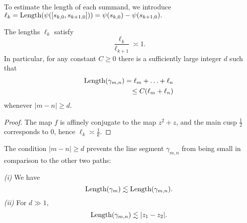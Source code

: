 

To estimate the length of each summand, we introduce $\ell_k = \operatorname{Length}(\psi([s_{k,0},s_{k+1,0}])) = \psi(s_{k,0})-\psi(s_{k+1,0}).$ 

\begin{lemma} \label{lem-ell_n}
	The lengths ${\ell_k}$ satisfy
	\begin{equation}
		\frac{\ell_k}{\ell_{k+1}} \asymp 1.
	\end{equation}
	In particular, for any constant $C \geq 0$ there is a sufficiently large integer $d$ such that
	\begin{align*}
		\operatorname{Length}(\gamma_{m,n}) = \ell_{m}+\ldots+\ell_{n} \\ \leq C (\ell_m+\ell_n)
	\end{align*}
	whenever $|m-n| \geq d$.
\end{lemma}
\begin{proof} \leavevmode
	The map $f$ is affinely conjugate to the map $z^2+z$, and the main cusp $\frac 12$ corresponds to $0$, hence $\ell_k \asymp \frac 1k$.
\end{proof}

%

The condition $|m-n| \geq d$ prevents the line segment $\gamma _{m,n}$ from being small in comparison to the other two paths:
\begin{proposition} \leavevmode
	\emph{(i)} We have \begin{equation}
		\operatorname{Length}(\gamma_m) \lesssim \operatorname{Length}(\gamma_{m,n}).
	\end{equation}
	\emph{(ii)} For $d \gg 1$, 
	\begin{equation}
		\operatorname{Length}(\gamma_{m,n}) \lesssim |z_1-z_2|.
	\end{equation}
\end{proposition}

